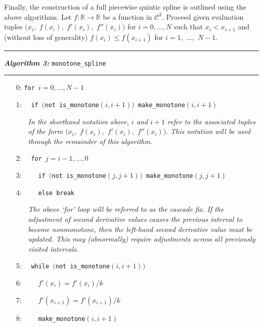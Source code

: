 \documentclass{article}
\begin{document}
Finally, the construction of a full piecewise quintic spline is outlined using the above algorithms. Let $f: \mathbb{R} \rightarrow \mathbb{R}$ be a function in $\mathcal{C}^2.$ Proceed given evaluation tuples $\big(x_i,$ $f(x_i),$ $f'(x_i),$ $f''(x_i)\big)$ for $i = 0,\ldots,N$ such that $x_i < x_{i+1}$ and (without loss of generality) $f(x_i) \leq f(x_{i+1})$ for $i = 1,$ $\ldots,$ $N-1$. 

\vspace{10pt}
\hrule
\vspace{3pt}
\noindent\textbf{\textit{Algorithm 3:}} \texttt{monotone\_spline}
\vspace{3pt}
\hrule

\begin{itemize}
  \itemsep0pt
  \parskip0pt

\item[0:] \texttt{for }$i=0,\ldots,N-1$
\item[1:] $\quad$\texttt{if $\big($not is\_monotone$(i,i+1)\big)$  make\_monotone$(i,i+1)$}

  \begin{itemize}
    \item[] \textit{In the shorthand notation above, $i$ and $i+1$ refer to the associated tuples of the form $(x_i,$ $f(x_i),$ $f'(x_i),$ $f''(x_i)).$ This notation will be used through the remainder of this algorithm.}
  \end{itemize}

\item[2:] $\quad$\texttt{for $j=i-1,\ldots,0$}
\item[3:] $\quad\quad$\texttt{if $\big($not is\_monotone$(j,j+1)\big)$  make\_monotone$(j,j+1)$}
\item[4:] $\quad\quad$\texttt{else break}

  \begin{itemize}
    \item[] \textit{The above `for' loop will be referred to as the cascade fix. If the adjustment of second derivative values causes the previous interval to become nonmonotone, then the left-hand second derivative value must be updated. This may (abnormally) require adjustments across all previously visited intervals.}
  \end{itemize}

\item[5:] $\quad$\texttt{while $\big($not is\_monotone$(i,i+1)\big)$}
\item[6:] $\quad\quad f'(x_i) = f'(x_i) / k$
\item[7:] $\quad\quad f'(x_{i+1}) = f'(x_{i+1}) / k$
\item[8:] $\quad\quad$\texttt{make\_monotone$(i,i+1)$}


\end{itemize}
\end{document}
